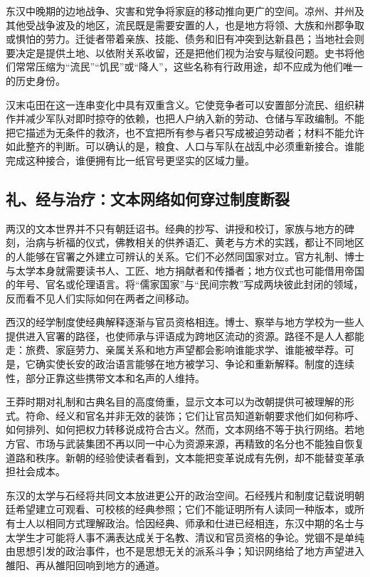 东汉中晚期的边地战争、灾害和党争将家庭的移动推向更广的空间。凉州、并州及其他受战争波及的地区，流民既是需要安置的人，也是地方将领、大族和州郡争取或惧怕的劳力。迁徙者带着亲族、技能、债务和旧有冲突到达新县邑；当地社会则要决定是提供土地、以依附关系收留，还是把他们视为治安与赋役问题。史书将他们常常压缩为“流民”“饥民”或“降人”，这些名称有行政用途，却不应成为他们唯一的历史身份。

汉末屯田在这一连串变化中具有双重含义。它使竞争者可以安置部分流民、组织耕作并减少军队对即时掠夺的依赖，也把人户纳入新的劳动、仓储与军政编制。不能把它描述为无条件的救济，也不宜把所有参与者只写成被迫劳动者；材料不能允许如此整齐的判断。可以确认的是，粮食、人口与军队在战乱中必须重新接合。谁能完成这种接合，谁便拥有比一纸官号更坚实的区域力量。

\subsection{礼、经与治疗：文本网络如何穿过制度断裂}

两汉的文本世界并不只有朝廷诏书。经典的抄写、讲授和校订，家族与地方的碑刻，治病与祈福的仪式，佛教相关的供养语汇、黄老与方术的实践，都让不同地区的人能够在官署之外建立可辨认的关系。它们不必然同国家对立。官方礼制、博士与太学本身就需要读书人、工匠、地方捐献者和传播者；地方仪式也可能借用帝国的年号、官名或伦理语言。将“儒家国家”与“民间宗教”写成两块彼此封闭的领域，反而看不见人们实际如何在两者之间移动。

西汉的经学制度使经典解释逐渐与官员资格相连。博士、察举与地方学校为一些人提供进入官署的路径，也使师承与评语成为跨地区流动的资源。路径不是人人都能走：旅费、家庭劳力、亲属关系和地方声望都会影响谁能求学、谁能被举荐。可是，它确实使长安的政治语言能够在地方被学习、争论和重新解释。制度的连续性，部分正靠这些携带文本和名声的人维持。

王莽时期对礼制和古典名目的高度倚重，显示文本可以为改朝提供可被理解的形式。符命、经义和官名并非无效的装饰；它们让官员知道新朝要求他们如何称呼、如何排列、如何把权力转移说成符合古义。然而，文本网络不等于执行网络。若地方官、市场与武装集团不再以同一中心为资源来源，再精致的名分也不能独自恢复道路和秩序。新朝的经验使读者看到，文本能把变革说成有先例，却不能替变革承担社会成本。

东汉的太学与石经将共同文本放进更公开的政治空间。石经残片和制度记载说明朝廷希望建立可观看、可校核的经典参照；它们不能证明所有人读同一种版本，或所有士人以相同方式理解政治。恰因经典、师承和仕进已经相连，东汉中期的名士与太学生才可能将人事不满表达成关于名教、清议和官员资格的争论。党锢不是单纯由思想引发的政治事件，也不是思想无关的派系斗争；知识网络给了地方声望进入雒阳、再从雒阳回响到地方的通道。

